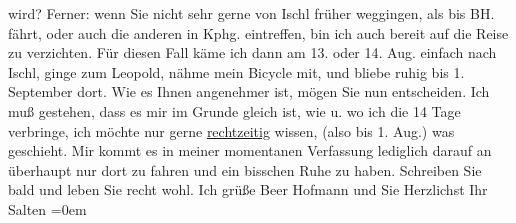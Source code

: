 \begin{ledgroupsized}[t]{13cm}
               wird? \pend
           \pstart
           Ferner: wenn Sie nicht sehr gerne von {\pb}Ischl früher weggingen, als bis BH. fährt, oder auch die anderen in Kphg.
               eintreffen, bin ich auch bereit auf die Reise zu verzichten. Für diesen Fall käme ich
               dann am 13. oder 14. Aug. einfach nach Ischl,
               ginge zum Leopold, nähme mein Bicycle mit, und
               bliebe ruhig bis 1. September dort. Wie es Ihnen angenehmer ist, mögen
               Sie nun entscheiden. Ich muß gestehen, dass es mir im Grunde gleich ist, wie u. wo
               ich die 14 Tage verbringe, ich möchte nur gerne \uline{rechtzeitig} wissen, (also bis 1. Aug.) was geschieht. Mir kommt es in meiner
               momentanen Verfassung lediglich darauf an überhaupt nur dort zu fahren und ein
               bisschen Ruhe zu haben. \pend
           \pstart
           Schreiben Sie bald und leben Sie recht wohl. Ich grüße Beer Hofmann und Sie \pend
           \pstart
           Herzlichst Ihr {\\[\baselineskip]}\spacefill\mbox{Salten}\pend
           \leftskip=0em{}
         
         \endnumbering{}\end{ledgroupsized}\begin{anhang}\end{anhang}\newcommand{\dateiname}{L03159}\newcommand{\titel}{Felix Salten an Arthur Schnitzler, 22. 7. 1895}\newcommand{\editorInnen}{Martin Anton Müller und Laura Untner}
      